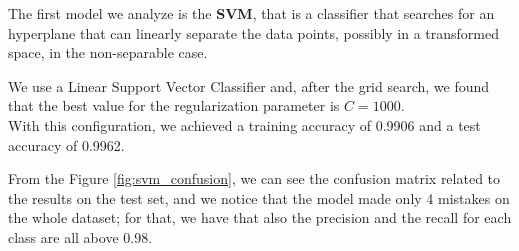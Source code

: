 The first model we analyze is the \textbf{SVM}, that is a classifier that searches for an hyperplane that can linearly separate the data points, possibly in a transformed space, in the non-separable case.

We use a Linear Support Vector Classifier and, after the grid search, we found that the best value for the regularization parameter is $C=1000$.\\
With this configuration, we achieved a training accuracy of 0.9906 and a test accuracy of 0.9962.

From the Figure \ref{fig:svm_confusion}, we can see the confusion matrix related to the results on the test set, and we notice that the model made only 4 mistakes on the whole dataset; for that, we have that also the precision and the recall for each class are all above 0.98.

